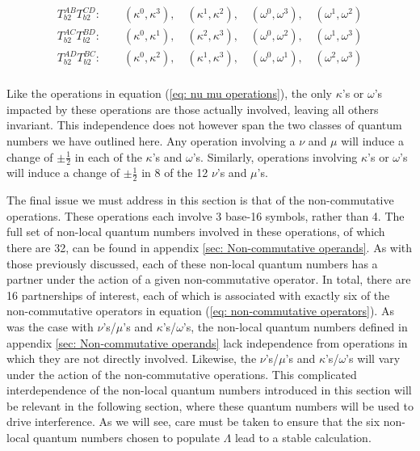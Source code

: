 \documentclass{article}
\begin{document}
\begin{equation}
\begin{array}{cc}
    T^{AB}_{b2}T^{CD}_{b2}:\qquad(\kappa^0,\kappa^3),\quad (\kappa^1,\kappa^2),\quad(\omega^0, \omega^3), \quad (\omega^1,\omega^2)
    \\
    T^{AC}_{b2}T^{BD}_{b2}:\qquad(\kappa^0,\kappa^1),\quad (\kappa^2,\kappa^3),\quad(\omega^0, \omega^2), \quad (\omega^1,\omega^3)
    \\
    T^{AD}_{b2}T^{BC}_{b2}:\qquad(\kappa^0,\kappa^2),\quad (\kappa^1,\kappa^3),\quad(\omega^0, \omega^1), \quad (\omega^2,\omega^3)
    \\
\end{array}
\end{equation}

Like the operations in equation (\ref{eq: nu mu operations}), the only $\kappa$'s or $\omega$'s impacted by these operations are those actually involved, leaving all others invariant. This independence does not however span the two classes of quantum numbers we have outlined here. Any operation involving a $\nu$ and $\mu$ will induce a change of $\pm\frac{1}{2}$ in each of the $\kappa$'s and $\omega$'s. Similarly, operations involving $\kappa$'s or $\omega$'s will induce a change of $\pm\frac{1}{2}$ in 8 of the 12 $\nu$'s and $\mu$'s.

The final issue we must address in this section is that of the non-commutative operations. These operations each involve 3 base-16 symbols, rather than 4. The full set of non-local quantum numbers involved in these operations, of which there are 32, can be found in appendix \ref{sec: Non-commutative operands}. As with those previously discussed, each of these non-local quantum numbers has a partner under the action of a given non-commutative operator. In total, there are 16 partnerships of interest, each of which is associated with exactly six of the non-commutative operators in equation (\ref{eq: non-commutative operators}). As was the case with $\nu$'s/$\mu$'s and $\kappa$'s/$\omega$'s, the non-local quantum numbers defined in appendix \ref{sec: Non-commutative operands} lack independence from operations in which they are not directly involved. Likewise, the $\nu$'s/$\mu$'s and $\kappa$'s/$\omega$'s will vary under the action of the non-commutative operations. This complicated interdependence of the non-local quantum numbers introduced in this section will be relevant in the following section, where these quantum numbers will be used to drive interference. As we will see, care must be taken to ensure that the six non-local quantum numbers chosen to populate $\Lambda$ lead to a stable calculation. 
\end{document}
